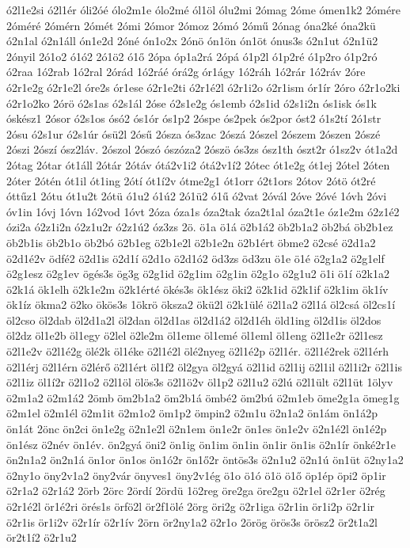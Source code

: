 {ó2l1e2si
ó2l1ér
óli2óé
ólo2m1e
ólo2mé
ól1öl
ólu2mi
2ómag
2óme
ómen1k2
2ómére
2óméré
2ómérn
2ómét
2ómi
2ómor
2ómoz
2ómó
2ómű
2ónag
óna2ké
óna2kü
ó2n1al
ó2n1áll
ón1e2d
2óné
ón1o2x
2ónö
ón1ön
ón1öt
ónus3s
ó2n1ut
ó2n1ü2
2ónyil
2ó1o2
ó1ó2
2ó1ö2
ó1ő
2ópa
óp1a2rá
2ópá
ó1p2l
ó1p2ré
ó1p2ro
ó1p2ró
ó2raa
1ó2rab
1ó2ral
2órád
1ó2ráé
órá2g
ór1ágy
1ó2ráh
1ó2rár
1ó2ráv
2óre
ó2r1e2g
ó2r1e2l
óre2s
ór1ese
ó2r1e2ti
ó2r1é2l
ó2r1i2o
ó2r1ism
ór1ír
2óro
ó2r1o2ki
ó2r1o2ko
2órö
ó2s1as
ó2s1ál
2óse
ó2s1e2g
ós1emb
ó2s1id
ó2s1i2n
ós1isk
ós1k
óskész1
2ósor
ó2s1os
ósó2
ós1ór
ós1p2
2óspe
ós2pek
ós2por
óst2
ó1s2tí
2ó1str
2ósu
ó2s1ur
ó2s1úr
ósü2l
2ósű
2ósza
ós3zac
2ószá
2ószel
2ószem
2ószen
2ószé
2ószi
2ószí
ósz2láv.
2ószol
2ószó
ószóza2
2ószö
ós3zs
ósz1th
ószt2r
ó1sz2v
ót1a2d
2ótag
2ótar
ót1áll
2ótár
2ótáv
ótá2v1i2
ótá2v1í2
2ótec
ót1e2g
ót1ej
2ótel
2óten
2óter
2ótén
ót1il
ót1ing
2ótí
ót1í2v
ótme2g1
ót1orr
ó2t1ors
2ótov
2ótö
ót2ré
óttűz1
2ótu
ót1u2t
2ótü
ó1u2
ó1ú2
2ó1ü2
ó1ű
ó2vat
2óvál
2óve
2óvé
1óvh
2óvi
óv1in
1óvj
1óvn
1ó2vod
1óvt
2óza
óza1s
óza2tak
óza2t1al
óza2t1e
óz1e2m
ó2z1é2
ózi2a
ó2z1i2n
ó2z1u2r
ó2z1ú2
óz3zs
2ö.
ö1a
ö1á
ö2b1á2
öb2b1a2
öb2bá
öb2b1ez
öb2b1is
öb2b1o
öb2bó
ö2b1eg
ö2b1e2l
ö2b1e2n
ö2b1ért
öbme2
ö2csé
ö2d1a2
ö2d1é2v
ödfé2
ö2d1is
ö2d1í
ö2d1o
ö2d1ó2
öd3zs
öd3zu
ö1e
ö1é
ö2g1a2
ö2g1elf
ö2g1esz
ö2g1ev
ögés3s
ög3g
ö2g1id
ö2g1im
ö2g1in
ö2g1o
ö2g1u2
ö1i
ö1í
ö2k1a2
ö2k1á
ök1elh
ö2k1e2m
ö2k1érté
ökés3s
ök1ész
öki2
ö2k1id
ö2k1if
ö2k1im
ök1ív
ök1íz
ökma2
ö2ko
ökös3s
1ökrö
öksza2
ökü2l
ö2k1ülé
ö2l1a2
ö2l1á
öl2csá
öl2cs1í
öl2cso
öl2dab
öl2d1a2l
öl2dan
öl2d1as
öl2d1á2
öl2d1éh
öld1ing
öl2d1is
öl2dos
öl2dz
öl1e2b
öl1egy
ö2lel
ö2le2m
öl1eme
öl1emé
öl1eml
öl1eng
ö2l1e2r
ö2l1esz
ö2l1e2v
ö2l1é2g
ölé2k
öl1éke
ö2l1é2l
ölé2nyeg
ö2l1é2p
ö2l1ér.
ö2l1é2rek
ö2l1érh
ö2l1érj
ö2l1érn
ö2lérő
ö2l1ért
öl1f2
öl2gya
öl2gyá
ö2l1id
ö2l1ij
ö2l1il
ö2l1i2r
ö2l1is
ö2l1iz
öl1í2r
ö2l1o2
ö2l1öl
ölös3s
ö2l1ö2v
öl1p2
ö2l1u2
ö2lú
ö2l1ült
ö2l1üt
1ölyv
ö2m1a2
ö2m1á2
2ömb
öm2b1a2
öm2b1á
ömbé2
öm2bú
ö2m1eb
öme2g1a
ömeg1g
ö2m1el
ö2m1él
ö2m1it
ö2m1o2
öm1p2
ömpin2
ö2m1u
ö2n1a2
ön1ám
ön1á2p
ön1át
2önc
ön2ci
ön1e2g
ö2n1e2l
ö2n1em
ön1e2r
ön1es
ön1e2v
ö2n1é2l
ön1é2p
ön1ész
ö2név
ön1év.
ön2gyá
öni2
ön1ig
ön1im
ön1in
ön1ir
ön1is
ö2n1ír
önké2r1e
ön2n1a2
ön2n1á
ön1or
ön1os
ön1ó2r
ön1ő2r
öntös3s
ö2n1u2
ö2n1ú
ön1üt
ö2ny1a2
ö2ny1o
öny2v1a2
öny2vár
önyves1
öny2v1ég
ö1o
ö1ó
ö1ö
ö1ő
öp1ép
öpi2
öp1ir
ö2r1a2
ö2r1á2
2örb
2örc
2ördí
2ördü
1ö2reg
öre2ga
öre2gu
ö2r1el
ö2r1er
ö2rég
ö2r1é2l
ör1é2ri
örés1s
örfö2l
ör2f1ölé
2örg
öri2g
ö2r1iga
ö2r1in
ör1i2p
ö2r1ir
ö2r1is
ör1i2v
ö2r1ír
ö2r1ív
2örn
ör2ny1a2
ö2r1o
2örög
örös3s
örösz2
ör2t1a2l
ör2t1í2
ö2r1u2
}
